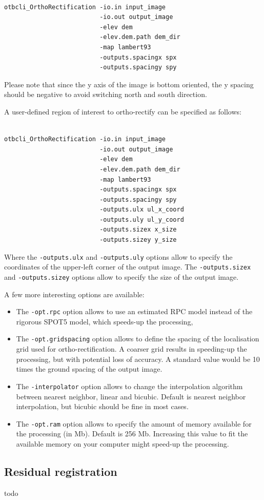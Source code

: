 \begin{verbatim}

otbcli_OrthoRectification -io.in input_image 
                          -io.out output_image 
                          -elev dem
                          -elev.dem.path dem_dir 
                          -map lambert93 
                          -outputs.spacingx spx 
                          -outputs.spacingy spy

\end{verbatim}

Please note that since the y axis of the image is bottom oriented, the
y spacing should be negative to avoid switching north and south direction.

A user-defined region of interest to ortho-rectify can be specified as
follows:

\begin{verbatim}

otbcli_OrthoRectification -io.in input_image 
                          -io.out output_image 
                          -elev dem 
                          -elev.dem.path dem_dir 
                          -map lambert93 
                          -outputs.spacingx spx 
                          -outputs.spacingy spy 
                          -outputs.ulx ul_x_coord 
                          -outputs.uly ul_y_coord 
                          -outputs.sizex x_size 
                          -outputs.sizey y_size

\end{verbatim}

Where the \verb?-outputs.ulx? and \verb?-outputs.uly? options allow to 
specify the coordinates of the upper-left corner of the output image.
The \verb?-outputs.sizex? and \verb?-outputs.sizey? options allow to 
specify the size of the output image.

A few more interesting options are available:
\begin{itemize}
\item The \verb?-opt.rpc? option allows to use an estimated RPC model
  instead of the rigorous SPOT5 model, which speeds-up the processing,
\item The \verb?-opt.gridspacing? option allows to define the spacing of the
  localisation grid used for ortho-rectification. A coarser grid
  results in speeding-up the processing, but with potential loss of
  accuracy. A standard value would be 10 times the ground spacing of 
  the output image.
\item The \verb?-interpolator? option allows to change the interpolation
  algorithm between nearest neighbor, linear and bicubic. Default is nearest 
  neighbor interpolation, but bicubic should be fine in most cases.
\item The \verb?-opt.ram? option allows to specify the amount of memory
  available for the processing (in Mb). Default is 256 Mb. Increasing
  this value to fit the available memory on your computer might
  speed-up the processing.
\end{itemize}


\subsection{Residual registration}\label{ssec:registration}
todo

